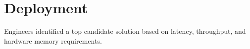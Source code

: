 \section{Deployment}
Engineers identified a top candidate solution based on latency, throughput, and hardware memory requirements.
